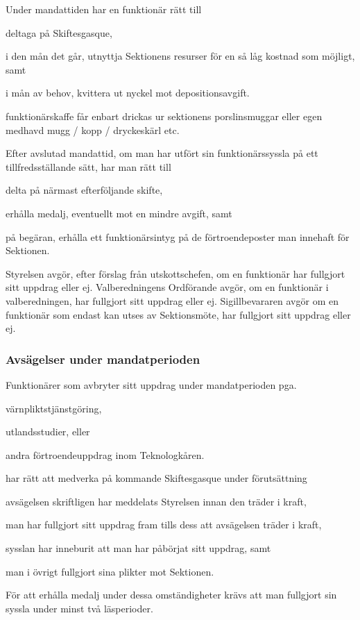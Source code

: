 \documentclass[10pt]{article}
\begin{document}
Under mandattiden har en funktionär rätt till
\begin{attlist}
    \item deltaga på Skiftesgasque,
    \item i den mån det går, utnyttja Sektionens resurser för en så låg
        kostnad som möjligt, samt
    \item i mån av behov, kvittera ut nyckel mot depositionsavgift.
    \item funktionärskaffe får enbart drickas ur sektionens porslinsmuggar eller egen medhavd mugg / kopp / dryckeskärl etc.
\end{attlist}
Efter avslutad mandattid, om man har utfört sin funktionärssyssla på ett
tillfredsställande sätt, har man rätt till
\begin{attlist}
    \item delta på närmast efterföljande skifte,
    \item erhålla medalj, eventuellt mot en mindre avgift, samt
    \item på begäran, erhålla ett funktionärsintyg på de förtroendeposter
        man innehaft för Sektionen.
\end{attlist}
Styrelsen avgör, efter förslag från utskottschefen, om en funktionär har
fullgjort sitt uppdrag eller ej.
Valberedningens Ordförande avgör, om en funktionär i valberedningen, har
fullgjort sitt uppdrag eller ej.
Sigillbevararen avgör om en funktionär som endast kan utses av Sektionsmöte,
har fullgjort sitt uppdrag eller ej.

\subsubsection{Avsägelser under mandatperioden}
Funktionärer som avbryter sitt uppdrag under mandatperioden pga.
\begin{alphlist}
    \item värnpliktstjänstgöring,
    \item utlandsstudier, eller
    \item andra förtroendeuppdrag inom Teknologkåren.
\end{alphlist}
har rätt att medverka på kommande Skiftesgasque under förutsättning
\begin{attlist}
    \item avsägelsen skriftligen har meddelats Styrelsen innan den träder
        i kraft,
    \item man har fullgjort sitt uppdrag fram tills dess att avsägelsen
        träder i kraft,
    \item sysslan har inneburit att man har påbörjat sitt uppdrag, samt
    \item man i övrigt fullgjort sina plikter mot Sektionen.
\end{attlist}
För att erhålla medalj under dessa omständigheter krävs att man fullgjort
sin syssla under minst två läsperioder.
\end{document}
